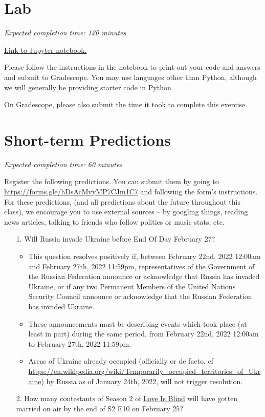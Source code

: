 \documentclass[11pt]{article}
\begin{document}
\section*{Lab}

\emph{Expected completion time: 120 minutes}

\href{https://bit.ly/34T4SlQ}{Link to Jupyter notebook.}

Please follow the instructions in the notebook to print out your code and answers and submit to Gradescope. You may use languages other than Python, although we will generally be providing starter code in Python.

On Gradescope, please also submit the time it took to complete this exercise.

\section*{Short-term Predictions}

\emph{Expected completion time: 60 minutes}

Register the following predictions. You can submit them by going to \url{https://forms.gle/hDsAcMvyMP7CJm1C7} and following the form's instructions. For these predictions, (and all predictions about the future throughout this class), we encourage you to use external sources -- by googling things, reading news articles, talking to friends who follow politics or music stats, etc.

\begin{enumerate}
	\item[1.] Will Russia invade Ukraine before End Of Day February 27?
	\begin{itemize}
		\item This question resolves positively if, between February 22nd, 2022 12:00am and February 27th, 2022 11:59pm, representatives of the Government of the Russian Federation announce or acknowledge that Russia has invaded Ukraine, or if any two Permanent Members of the United Nations Security Council announce or acknowledge that the Russian Federation has invaded Ukraine. 

		\item These announcements must be describing events which took place (at least in part) during the same period, from February 22nd, 2022 12:00am to February 27th, 2022 11:59pm. 
		
		\item Areas of Ukraine already occupied (officially or de facto, cf \url{https://en.wikipedia.org/wiki/Temporarily_occupied_territories_of_Ukraine}) by Russia as of January 24th, 2022, will not trigger resolution.
	\end{itemize} 
	\item[2.] How many contestants of Season 2 of \href{https://en.wikipedia.org/wiki/Love_Is_Blind_(TV_series)}{Love Is Blind} will have gotten married on air by the end of S2 E10 on February 25?
\end{enumerate}
\end{document}
